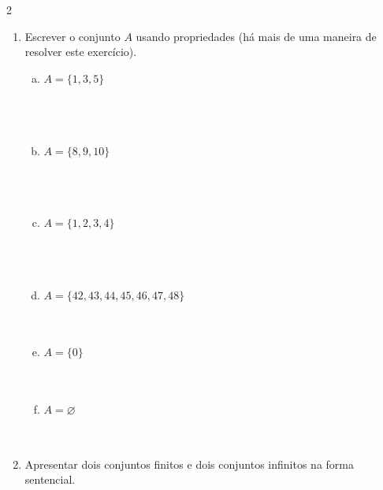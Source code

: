 \documentclass[a4paper,14pt]{article}
\begin{document}
\begin{multicols}{2}
\begin{enumerate}
\begin{enumerate}[a)]
    				\item $A = \{x \in \mathbb{N} \text{~t.q.~} 3 \leq x < 10\}$ \\\\\\\\\\\\
    				\item $A = \{x \in \mathbb{N}~|~x \leq 4 \text{~e~} x > 7\}$ \\\\\\\\\\\\
    			\end{enumerate}
    			\item Escrever o conjunto $A$ usando propriedades (há mais de uma maneira de resolver este exercício).
    			\begin{enumerate}[a)]
    				\item $A = \{1, 3, 5\}$ \\\\\\\\
    				\item $A = \{8, 9, 10\}$ \\\\\\\\
    				\item $A = \{1, 2, 3, 4\}$ \\\\\\\\
    				\item $A = \{42, 43, 44, 45, 46, 47, 48\}$ \\\\\\
    				\item $A = \{0\}$ \\\\\\
    				\item $A = \varnothing$ \\\\\\
    			\end{enumerate}
    			\item Apresentar dois conjuntos finitos e dois conjuntos infinitos na forma sentencial. \\\\\\\\\\\\

\end{enumerate}
\end{multicols}
\end{document}
